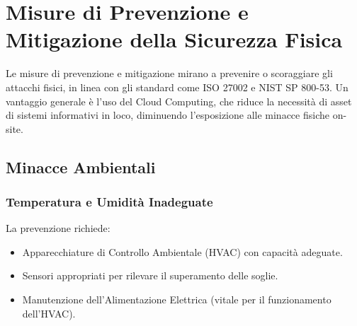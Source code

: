 \section{Misure di Prevenzione e Mitigazione della Sicurezza Fisica}

Le misure di prevenzione e mitigazione mirano a prevenire o scoraggiare gli attacchi fisici, in linea con gli standard come ISO 27002 e NIST SP 800-53.
Un vantaggio generale è l'uso del Cloud Computing, che riduce la necessità di asset di sistemi informativi in loco, diminuendo l'esposizione alle minacce fisiche on-site.

\subsection{Minacce Ambientali}

\subsubsection{Temperatura e Umidità Inadeguate}
La prevenzione richiede:
\begin{itemize}
    \item Apparecchiature di Controllo Ambientale (HVAC) con capacità adeguate.
    \item Sensori appropriati per rilevare il superamento delle soglie.
    \item Manutenzione dell'Alimentazione Elettrica (vitale per il funzionamento dell'HVAC).
\end{itemize}

